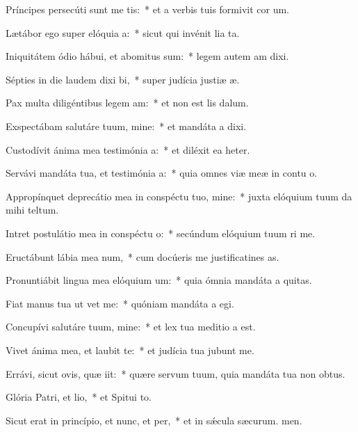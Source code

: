 \item Príncipes persecúti sunt me tis:~* et a verbis tuis formivit cor um.
\item Lætábor ego super elóquia a:~* sicut qui invénit lia ta.
\item Iniquitátem ódio hábui, et abomitus sum:~* legem autem am dixi.
\item Sépties in die laudem dixi bi,~* super judícia justiæ æ.
\item Pax multa diligéntibus legem am:~* et non est lis dalum.
\item Exspectábam salutáre tuum, mine:~* et mandáta a dixi.
\item Custodívit ánima mea testimónia a:~* et diléxit ea heter.
\item Servávi mandáta tua, et testimónia a:~* quia omnes viæ meæ in contu o.
\item Appropínquet deprecátio mea in conspéctu tuo, mine:~* juxta elóquium tuum da mihi teltum.
\item Intret postulátio mea in conspéctu o:~* secúndum elóquium tuum ri me.
\item Eructábunt lábia mea num,~* cum docúeris me justificatines as.
\item Pronuntiábit lingua mea elóquium um:~* quia ómnia mandáta a quitas.
\item Fiat manus tua ut vet me:~* quóniam mandáta a egi.
\item Concupívi salutáre tuum, mine:~* et lex tua meditio a est.
\item Vivet ánima mea, et laubit te:~* et judícia tua jubunt me.
\item Errávi, sicut ovis, quæ iit:~* quære servum tuum, quia mandáta tua non  obtus.
\item Glória Patri, et lio,~* et Spitui to.
\item Sicut erat in princípio, et nunc, et per,~* et in sǽcula sæcurum. men.
